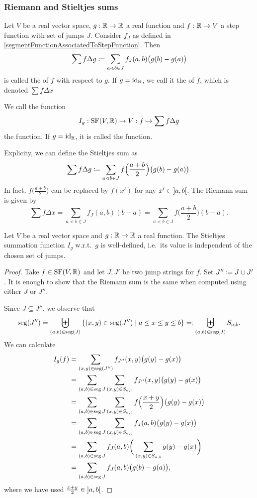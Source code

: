 \subsubsection{Riemann and Stieltjes sums}
\begin{definition}
Let $V$ be a real vector space, $g: \mathbb{R}\to \mathbb{R}$ a real function and $f: \mathbb{R}\to V$ a step function with set of jumps $J$. Consider $f_J$ as defined in \ref{segmentFunctionAssociatedToStepFunction}. Then
\[ \sum f \Delta{g} \coloneqq \sum_{a \lessdot b\in J} f_J(a,b)\big(g(b) - g(a)\big) \]
is called the  of $f$ with respect to $g$. If $g = \operatorname{id}_{\mathbb{R}}$, we call it the  of $f$, which is denoted $\sum f \Delta{x}$

We call the function
\[ I_g: \operatorname{SF}(V,\mathbb{R}) \to V: f \mapsto \sum f \Delta{g} \]
the  function. If $g = \operatorname{id}_{\mathbb{R}}$, it is called the  function.
\end{definition}
Explicity, we can define the Stieltjes sum as
\[ \sum f \Delta{g} \coloneqq \sum_{a \lessdot b\in J} f\Big(\frac{a+ b}{2}\Big)\big(g(b) - g(a)\big). \]
In fact, $f\big(\frac{a + b}{2}\big)$ can be replaced by $f(x')$ for any $x'\in \interval[o]{a, b}$. 
The Riemann sum is given by
\[ \sum f \Delta{x} = \sum_{a\lessdot b \in J} f_J(a,b)(b - a) = \sum_{a\lessdot b \in J} f\Big(\frac{a+ b}{2}\Big)(b - a). \]

\begin{lemma}
Let $V$ be a real vector space and $g: \mathbb{R}\to \mathbb{R}$ a real function. The Stieltjes summation function $I_g$ w.r.t.\ $g$ is well-defined, i.e.\ its value is independent of the chosen set of jumps.
\end{lemma}
\begin{proof}
Take $f\in \operatorname{SF}(V,\mathbb{R})$ and let $J,J'$ be two jump strings for $f$. Set $J'' \coloneqq J\cup J'$. It is enough to show that the Riemann sum is the same when computed using either $J$ or $J''$.

Since $J \subseteq J ''$, we observe that
\[ \seg(J'') = \biguplus_{(a,b) \in \seg(J)}\setbuilder{(x,y)\in \seg(J'')}{a \leq x \leq y \leq b} \eqdef \biguplus_{(a,b) \in \seg(J)} S_{a,b}. \]
We can calculate
\begin{align*}
I_g(f) &= \sum_{(x,y)\in \operatorname{seg}(J'')} f_{J''}(x,y)\big(g(y) - g(x)\big)  \\
&= \sum_{(a,b)\in \operatorname{seg}{J}}\sum_{(x,y)\in S_{a,b}} f_{J''}(x,y)\big(g(y) - g(x)\big)  \\
&= \sum_{(a,b)\in \operatorname{seg}{J}}\sum_{(x,y)\in S_{a,b}} f\Big(\frac{x+y}{2}\Big)\big(g(y) - g(x)\big)  \\
&= \sum_{(a,b)\in \operatorname{seg}{J}}\sum_{(x,y)\in S_{a,b}} f_J(a,b)\big(g(y) - g(x)\big)  \\
&= \sum_{(a,b)\in \operatorname{seg}{J}}f_J(a,b)\bigg(\sum_{(x,y)\in S_{a,b}}g(y) - g(x)\bigg) \\
&= \sum_{(a,b)\in \operatorname{seg}{J}}f_J(a,b)\big(g(b) - g(a)\big),
\end{align*}
where we have used $\frac{x+y}{2} \in \interval[o]{a,b}$.
\end{proof}

